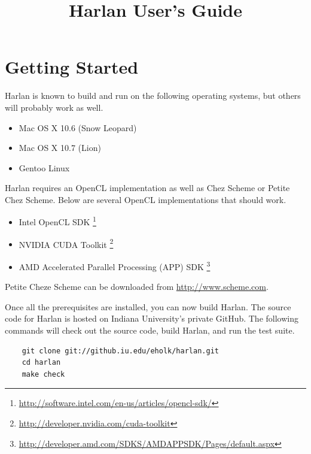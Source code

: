 \documentclass[oneside]{report}
\begin{document}

\title{Harlan User's Guide}

\maketitle

\tableofcontents

\chapter{Getting Started}

Harlan is known to build and run on the following operating systems, but others will probably work as well.

\begin{itemize}
\item Mac OS X 10.6 (Snow Leopard)
\item Mac OS X 10.7 (Lion)
\item Gentoo Linux
\end{itemize}

Harlan requires an OpenCL implementation as well as Chez Scheme or
Petite Chez Scheme. Below are several OpenCL implementations that
should work.

\begin{itemize}
\item Intel OpenCL SDK
  \footnote{\url{http://software.intel.com/en-us/articles/opencl-sdk/}}
\item NVIDIA CUDA Toolkit
  \footnote{\url{http://developer.nvidia.com/cuda-toolkit}}
\item AMD Accelerated Parallel Processing (APP) SDK
  \footnote{\url{http://developer.amd.com/SDKS/AMDAPPSDK/Pages/default.aspx}}
\end{itemize}

Petite Cheze Scheme can be downloaded from
\url{http://www.scheme.com}.

Once all the prerequisites are installed, you can now build
Harlan. The source code for Harlan is hosted on Indiana University's
private GitHub. The following commands will check out the source code,
build Harlan, and run the test suite.

\begin{verbatim}
    git clone git://github.iu.edu/eholk/harlan.git
    cd harlan
    make check
\end{verbatim}
\end{document}
